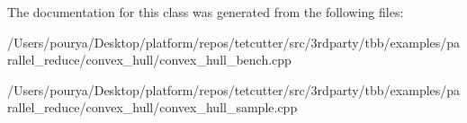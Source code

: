 The documentation for this class was generated from the following files\+:\begin{DoxyCompactItemize}
\item 
/\+Users/pourya/\+Desktop/platform/repos/tetcutter/src/3rdparty/tbb/examples/parallel\+\_\+reduce/convex\+\_\+hull/convex\+\_\+hull\+\_\+bench.\+cpp\item 
/\+Users/pourya/\+Desktop/platform/repos/tetcutter/src/3rdparty/tbb/examples/parallel\+\_\+reduce/convex\+\_\+hull/convex\+\_\+hull\+\_\+sample.\+cpp\end{DoxyCompactItemize}
